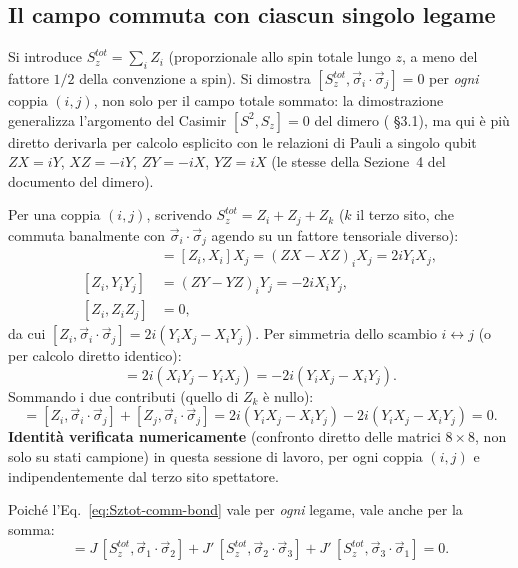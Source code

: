 \documentclass[11pt,a4paper]{article}
\begin{document}
\subsection{Il campo commuta con ciascun singolo legame}

Si introduce $S_z^{tot}=\sum_i Z_i$ (proporzionale allo spin totale lungo $z$, a meno del fattore $1/2$ della convenzione a spin). Si dimostra $[S_z^{tot},\vec\sigma_i\cdot\vec\sigma_j]=0$ per \emph{ogni} coppia $(i,j)$, non solo per il campo totale sommato: la dimostrazione generalizza l'argomento del Casimir $[S^2,S_z]=0$ del dimero (\texttt{} \S3.1), ma qui è più diretto derivarla per calcolo esplicito con le relazioni di Pauli a singolo qubit $ZX=iY$, $XZ=-iY$, $ZY=-iX$, $YZ=iX$ (le stesse della Sezione~4 del documento del dimero).

Per una coppia $(i,j)$, scrivendo $S_z^{tot}=Z_i+Z_j+Z_k$ ($k$ il terzo sito, che commuta banalmente con $\vec\sigma_i\cdot\vec\sigma_j$ agendo su un fattore tensoriale diverso):
\begin{align}
[Z_i,X_iX_j] &= [Z_i,X_i]X_j = (ZX-XZ)_i X_j = 2iY_iX_j,\\
[Z_i,Y_iY_j] &= (ZY-YZ)_i Y_j = -2iX_iY_j,\\
[Z_i,Z_iZ_j] &= 0,
\end{align}
da cui $[Z_i,\vec\sigma_i\cdot\vec\sigma_j] = 2i(Y_iX_j-X_iY_j)$. Per simmetria dello scambio $i\leftrightarrow j$ (o per calcolo diretto identico):
\begin{equation}
[Z_j,\vec\sigma_i\cdot\vec\sigma_j] = 2i(X_iY_j-Y_iX_j) = -2i(Y_iX_j-X_iY_j).
\end{equation}
Sommando i due contributi (quello di $Z_k$ è nullo):
\begin{equation}
[S_z^{tot},\,\vec\sigma_i\cdot\vec\sigma_j] = [Z_i,\vec\sigma_i\cdot\vec\sigma_j]+[Z_j,\vec\sigma_i\cdot\vec\sigma_j] = 2i(Y_iX_j-X_iY_j) - 2i(Y_iX_j-X_iY_j) = 0.
\label{eq:Sztot-comm-bond}
\end{equation}
\textbf{Identità verificata numericamente} (confronto diretto delle matrici $8\times8$, non solo su stati campione) in questa sessione di lavoro, per ogni coppia $(i,j)$ e indipendentemente dal terzo sito spettatore.

Poiché l'Eq.~\eqref{eq:Sztot-comm-bond} vale per \emph{ogni} legame, vale anche per la somma:
\begin{equation}
[S_z^{tot}, H_{ex}] = J\,[S_z^{tot},\vec\sigma_1\!\cdot\!\vec\sigma_2] + J'\,[S_z^{tot},\vec\sigma_2\!\cdot\!\vec\sigma_3] + J'\,[S_z^{tot},\vec\sigma_3\!\cdot\!\vec\sigma_1] = 0.
\label{eq:Sztot-Hex-comm}
\end{equation}
\end{document}
